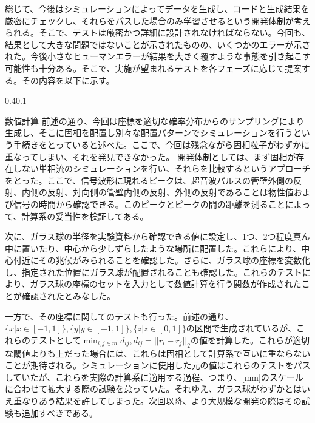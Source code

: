 \documentclass[uplatex]{suribt}
\makeatletter
\renewcommand{\subsection}{%
    \@startsection{subsection}{1}{\z@}%
    {0.4\Cvs}{0.1\Cvs}%
    {\normalfont\normalsize\headfont\raggedright}}
\makeatother
\begin{document}
総じて、今後はシミュレーションによってデータを生成し、コードと生成結果を厳密にチェックし、それらをパスした場合のみ学習させるという開発体制が考えられる。そこで、テストは厳密かつ詳細に設計されなければならない。今回も、結果として大きな問題ではないことが示されたものの、いくつかのエラーが示された。今後小さなヒューマンエラーが結果を大きく覆すような事態を引き起こす可能性も十分ある。そこで、実施が望まれるテストを各フェーズに応じて提案する。その内容を以下に示す。\par
\subsection{数値計算}
前述の通り、今回は座標を適切な確率分布からのサンプリングにより生成し、そこに固相を配置し別々な配置パターンでシミュレーションを行うという手続きをとっていると述べた。ここで、今回は残念ながら固相粒子がわずかに重なってしまい、それを発見できなかった。
開発体制としては、まず固相が存在しない単相流のシミュレーションを行い、それらを比較するというアプローチをとった。ここで、信号波形に現れるピークは、超音波パルスの管壁外側の反射、内側の反射、対向側の管壁内側の反射、外側の反射であることは物性値および信号の時間から確認できる。このピークとピークの間の距離を測ることによって、計算系の妥当性を検証してある。\par
次に、ガラス球の半径を実験資料から確認できる値に設定し、1つ、2つ程度真ん中に置いたり、中心から少しずらしたような場所に配置した。これらにより、中心付近にその兆候がみられることを確認した。さらに、ガラス球の座標を変数化し、指定された位置にガラス球が配置されることも確認した。これらのテストにより、ガラス球の座標のセットを入力として数値計算を行う関数が作成されたことが確認されたとみなした。\par
一方で、その座標に関してのテストも行った。前述の通り、$\{x | x\in[-1,1]\},\{y | y\in [-1,1]\},\{z |z \in [0,1]\}$の区間で生成されているが、これらのテストとして$\min_{i,j\in m}d_{ij}, d_{ij}=||r_i-r_j||_2$の値を計算した。これらが適切な閾値よりも上だった場合には、これらは固相として計算系で互いに重ならないことが期待される。シミュレーションに使用した元の値はこれらのテストをパスしていたが、これらを実際の計算系に適用する過程、つまり、[mm]のスケールに合わせて拡大する際の試験を怠っていた。それゆえ、ガラス球がわずかとはいえ重なりあう結果を許してしまった。次回以降、より大規模な開発の際はその試験も追加すべきである。\par
\end{document}
